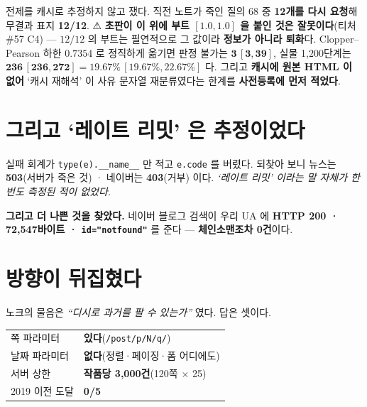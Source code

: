 \documentclass[10pt]{article}
\begin{document}
전제를 캐시로 추정하지 않고 쟀다. 직전 노트가 죽인 질의 68 중 \textbf{12개를
다시 요청}해 무결과 표지 \textbf{12/12}. ⚠ \textbf{초판이 이 위에 부트
$[1.0,1.0]$ 을 붙인 것은 잘못이다}(티처 \#57 C4) --- $12/12$ 의 부트는 필연적으로
그 값이라 \textbf{정보가 아니라 퇴화}다. Clopper--Pearson 하한 $0.7354$ 로
정직하게 옮기면 판정 불가는 $\mathbf{3\,[3, 39]}$, 실물 1,200단계는
$\mathbf{236\,[236, 272]} = 19.67\%\,[19.67\%, 22.67\%]$ 다. 그리고
\textbf{캐시에 원본 HTML 이 없어} `캐시 재해석' 이 사유 문자열 재분류였다는
한계를 \textbf{사전등록에 먼저 적었다}.


\section{그리고 `레이트 리밋' 은 추정이었다}

실패 회계가 \texttt{type(e).\_\_name\_\_} 만 적고 \texttt{e.code} 를 버렸다.
되찾아 보니 뉴스는 \textbf{503}(서버가 죽은 것) · 네이버는 \textbf{403}(거부)
이다. \emph{`레이트 리밋' 이라는 말 자체가 한 번도 측정된 적이 없었다.}

\textbf{그리고 더 나쁜 것을 찾았다.} 네이버 블로그 검색이 우리 UA 에
\textbf{HTTP 200 · 72,547바이트 · \texttt{id="notfound"}} 를 준다 ---
\textbf{체인소맨조차 0건}이다.


\section{방향이 뒤집혔다}

노크의 물음은 \emph{``디시로 과거를 팔 수 있는가''} 였다. 답은 셋이다.

\begin{center}\small
\begin{tabular}{ll}
\toprule
쪽 파라미터 & \textbf{있다}(\texttt{/post/p/N/q/}) \\
날짜 파라미터 & \textbf{없다}(정렬·페이징·폼 어디에도) \\
서버 상한 & \textbf{작품당 3,000건}(120쪽 $\times$ 25) \\
2019 이전 도달 & \textbf{0/5} \\
\bottomrule
\end{tabular}
\end{center}
\end{document}
